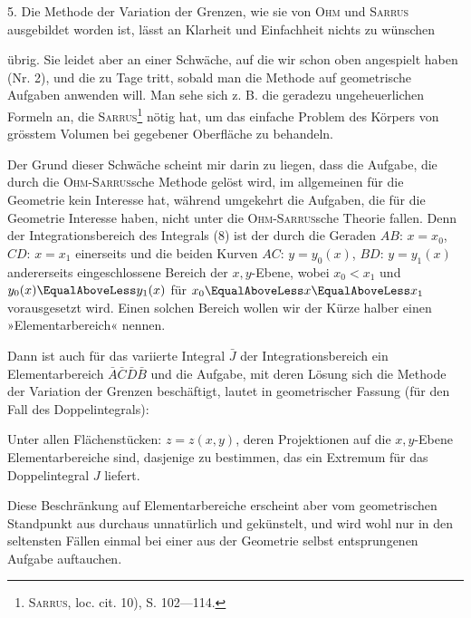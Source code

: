 \clearpage\begingroup\NoSourceHead
\renewcommand{\thefootnote}{\arabic{footnote})}\setcounter{footnote}{13}
\noindent\hspace*{\parindent}5. Die Methode der Variation der Grenzen, wie sie von \textsc{Ohm} und \textsc{Sarrus}
ausgebildet worden ist, lässt an Klarheit und Einfachheit nichts zu wünschen
\par\clearpage{}
\noindent übrig. Sie leidet aber an einer Schwäche, auf die wir schon oben angespielt
haben (Nr. 2), und die zu Tage tritt, sobald man die Methode auf geometrische
Aufgaben anwenden will. Man sehe sich z. B. die geradezu ungeheuerlichen
Formeln an, die \textsc{Sarrus}\footnote{\textsc{Sarrus}, loc. cit. 10), S. 102—114.} nötig hat, um das einfache Problem des Körpers
von grösstem Volumen bei gegebener Oberfläche zu behandeln.

Der Grund dieser Schwäche scheint mir darin zu liegen, dass die Aufgabe,
die durch die \textsc{Ohm-Sarrus}sche Methode gelöst wird, im allgemeinen für
die Geometrie kein Interesse hat, während umgekehrt die Aufgaben, die für
die Geometrie Interesse haben, nicht unter die \textsc{Ohm-Sarrus}sche Theorie fallen.
Denn der Integrationsbereich des Integrals (8) ist der durch die Geraden $AB$:
$x=x_0$, $CD$: $x=x_1$ einerseits und die beiden Kurven $AC$: $y=y_0(x)$, $BD$:
$y=y_1(x)$ andererseits eingeschlossene Bereich der $x,y$-Ebene, wobei $x_0<x_1$
und $y_0(x)\EqualAboveLess y_1(x)$ für $x_0\EqualAboveLess x\EqualAboveLess x_1$ vorausgesetzt wird. Einen solchen Bereich
wollen wir der Kürze halber einen »Elementarbereich« nennen.

Dann ist auch für das variierte Integral $\bar J$ der Integrationsbereich ein
Elementarbereich $\bar A\bar C\bar D\bar B$ und die Aufgabe, mit deren Lösung sich die Methode
der Variation der Grenzen beschäftigt, lautet in geometrischer Fassung
(für den Fall des Doppelintegrals):

Unter allen Flächenstücken: $z=z(x,y)$, deren Projektionen auf die $x,y$-Ebene
Elementarbereiche sind, dasjenige zu bestimmen, das ein Extremum für
das Doppelintegral $J$ liefert.

Diese Beschränkung auf Elementarbereiche erscheint aber vom geometrischen
Standpunkt aus durchaus unnatürlich und gekünstelt, und wird wohl
nur in den seltensten Fällen einmal bei einer aus der Geometrie selbst entsprungenen
Aufgabe auftauchen.

